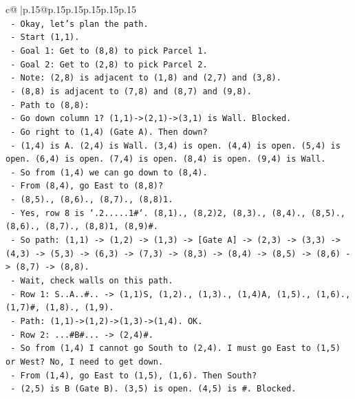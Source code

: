 \documentclass{article}
\begin{document}
{\begin{supertabular}{c@{$\;$}|p{.15\linewidth}@{}p{.15\linewidth}p{.15\linewidth}p{.15\linewidth}p{.15\linewidth}p{.15\linewidth}}
{{{\\ 
\texttt{  {-} Okay, let's plan the path.} \\
\texttt{  {-} Start (1,1).} \\
\texttt{  {-} Goal 1: Get to (8,8) to pick Parcel 1.} \\
\texttt{  {-} Goal 2: Get to (2,8) to pick Parcel 2.} \\
\texttt{  {-} Note: (2,8) is adjacent to (1,8) and (2,7) and (3,8).} \\
\texttt{  {-} (8,8) is adjacent to (7,8) and (8,7) and (9,8).} \\
\texttt{  {-} Path to (8,8):} \\
\texttt{    {-} Go down column 1? (1,1){-}>(2,1){-}>(3,1) is Wall. Blocked.} \\
\texttt{    {-} Go right to (1,4) (Gate A). Then down?} \\
\texttt{      {-} (1,4) is A. (2,4) is Wall. (3,4) is open. (4,4) is open. (5,4) is open. (6,4) is open. (7,4) is open. (8,4) is open. (9,4) is Wall.} \\
\texttt{      {-} So from (1,4) we can go down to (8,4).} \\
\texttt{      {-} From (8,4), go East to (8,8)?} \\
\texttt{        {-} (8,5)., (8,6)., (8,7)., (8,8)1.} \\
\texttt{        {-} Yes, row 8 is `.2.....1\#`. (8,1)., (8,2)2, (8,3)., (8,4)., (8,5)., (8,6)., (8,7)., (8,8)1, (8,9)\#.} \\
\texttt{        {-} So path: (1,1) {-}> (1,2) {-}> (1,3) {-}> {[}Gate A{]} {-}> (2,3) {-}> (3,3) {-}> (4,3) {-}> (5,3) {-}> (6,3) {-}> (7,3) {-}> (8,3) {-}> (8,4) {-}> (8,5) {-}> (8,6) {-}> (8,7) {-}> (8,8).} \\
\texttt{        {-} Wait, check walls on this path.} \\
\texttt{        {-} Row 1: S..A..\#.. {-}> (1,1)S, (1,2)., (1,3)., (1,4)A, (1,5)., (1,6)., (1,7)\#, (1,8)., (1,9).} \\
\texttt{          {-} Path: (1,1){-}>(1,2){-}>(1,3){-}>(1,4). OK.} \\
\texttt{        {-} Row 2: ...\#B\#... {-}> (2,4)\#.} \\
\texttt{          {-} So from (1,4) I cannot go South to (2,4). I must go East to (1,5) or West? No, I need to get down.} \\
\texttt{          {-} From (1,4), go East to (1,5), (1,6). Then South?} \\
\texttt{          {-} (2,5) is B (Gate B). (3,5) is open. (4,5) is \#. Blocked.} \\
}}}
\end{supertabular}}
\end{document}
